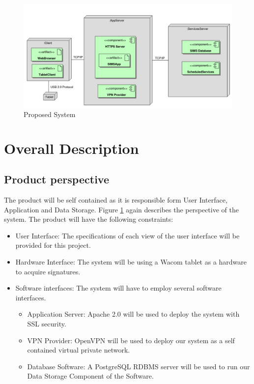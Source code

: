 \documentclass[11pt,a4paper]{report}
\begin{document}
\begin{figure}[htp]
\centering
\includegraphics[scale=0.40]{diagrams/SystemOverview.png}
\caption{Proposed System}
\label{fig:New_Sys}
\end{figure}



\section{Overall Description}

\subsection{Product perspective}
The product will be self contained as it is responsible form User Interface, Application and Data Storage.
Figure \ref{fig:New_Sys} again describes the perspective of the system.
The product will have the following constraints:
\begin{itemize}
\item User Interface: The specifications of each view of the user interface will be provided for this project.
\item Hardware Interface: The system will be using a Wacom tablet as a hardware to acquire signatures.
\item Software interfaces: The system will have to employ several software interfaces.
\begin{itemize}
\item Application Server: Apache 2.0 will be used to deploy the system with SSL security.
\item VPN Provider: OpenVPN will be used to deploy our system as a self contained virtual private
network.
\item Database Software: A PostgreSQL RDBMS server will be used to run our Data Storage Component of the Software.
\end{itemize}
\end{itemize}
\end{document}
